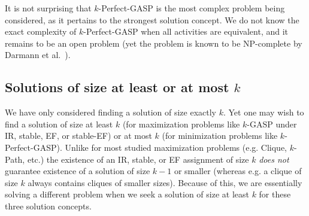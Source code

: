 It is not surprising that $k$-Perfect-GASP is the most complex problem being considered, as it pertains to the strongest solution concept. We do not know the exact complexity of $k$-Perfect-GASP when all activities are equivalent, and it remains to be an open problem (yet the problem is known to be NP-complete by Darmann et al.~\cite{GASP12WINE}).



\subsection{Solutions of size at least or at most $k$}
We have only considered finding a solution of size exactly $k$.
Yet one may wish to find a solution of size at least $k$ (for maximization problems like $k$-GASP under IR, stable, EF, or stable-EF) or at most $k$ (for minimization problems like $k$-Perfect-GASP).
Unlike for most studied maximization problems (e.g. Clique, $k$-Path, etc.) the existence of an IR, stable, or EF assignment of size $k$ {\em does not} guarantee existence of a solution of size $k-1$ or smaller (whereas e.g. a clique of size $k$ always contains cliques of smaller sizes).
Because of this, we are essentially solving a different problem when we seek a solution of size at least $k$ for these three solution concepts. 

